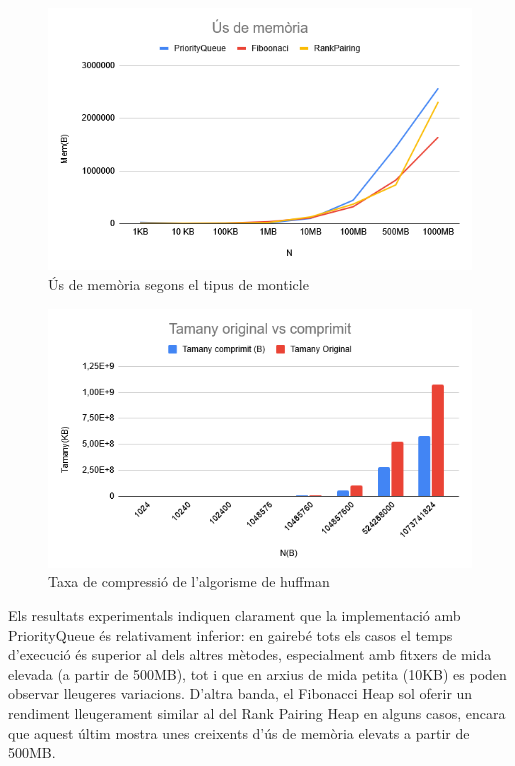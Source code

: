 \documentclass{ieeetj}
\begin{document}
\begin{figure}[H]
    \centering
    \includegraphics[width=1\linewidth]{png/neo_us_memoria.png}
    \caption{Ús de memòria segons el tipus de monticle}
    \label{fig:enter-label}
\end{figure}
\begin{figure}[H]
    \centering
    \includegraphics[width=1\linewidth]{png/neo_comparativa_tamanys.png}
    \caption{Taxa de compressió de l'algorisme de huffman}
    \label{fig:enter-label}
\end{figure}



Els resultats experimentals indiquen clarament que la implementació amb PriorityQueue és relativament inferior: en gairebé tots els casos el temps d'execució és superior al dels altres mètodes, especialment amb fitxers de mida elevada (a partir de 500MB), tot i que en arxius de mida petita (10KB) es poden observar lleugeres variacions. D'altra banda, el Fibonacci Heap sol oferir un rendiment lleugerament similar al del Rank Pairing Heap en alguns casos, encara que aquest últim mostra unes creixents d'ús de memòria elevats a partir de 500MB.\newline
\end{document}
